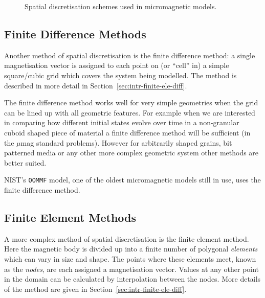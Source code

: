 \begin{figure}[h]
  \centering
  \caption{Spatial discretisation schemes used in micromagnetic models.}
  \label{fig:types-spat-discl}
\end{figure}


\subsection{Finite Difference Methods}
\label{sec:sd-finite-diff-meth}

Another method of spatial discretisation is the finite difference method: a single magnetisation vector is assigned to each point on (or ``cell'' in) a simple square/cubic grid which covers the system being modelled. The method is described in more detail in Section~\ref{sec:intr-finite-ele-diff}.

The finite difference method works well for very simple geometries when the grid can be lined up with all geometric features. For example when we are interested in comparing how different initial states evolve over time in a non-granular cuboid shaped piece of material a finite difference method will be sufficient (\eg in the $\mu$mag standard problems\cite{mumag-website}). However for arbitrarily shaped grains, bit patterned media or any other more complex geometric system other methods are better suited.

NIST's \texttt{OOMMF} model, one of the oldest micromagnetic models still in use, uses the finite difference method\cite{oommf-website}.

\subsection{Finite Element Methods}
\label{sec:sd-finite-elem-meth}

A more complex method of spatial discretisation is the finite element method. Here the magnetic body is divided up into a finite number of polygonal \emph{elements} which can vary in size and shape. The points where these elements meet, known as the \emph{nodes}, are each assigned a magnetisation vector. Values at any other point in the domain can be calculated by interpolation between the nodes. More details of the method are given in Section~\ref{sec:intr-finite-ele-diff}.

